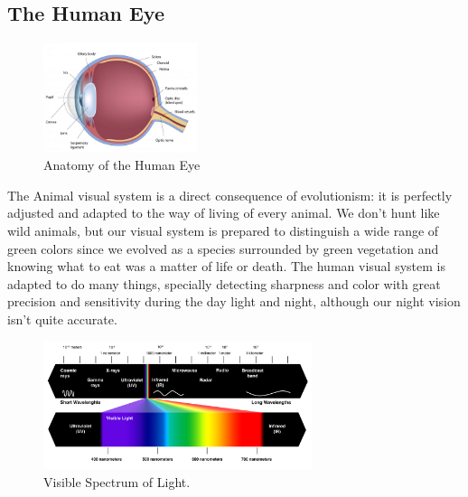 \documentclass{report}
\begin{document}
\subsection{The Human Eye}
\label{sec:humaneye}
%
\begin{figure}
	\begin{center}
    \vspace{-2\baselineskip}
	\includegraphics[width=0.4\textwidth]{Eye_Anatomy.jpg}
	\end{center}
    \caption[The Human Eye]{Anatomy of the Human Eye\protect\footnotemark{}}
    \label{fig:eye}
\end{figure}
%
The Animal visual system is a direct consequence of evolutionism: it is perfectly adjusted and adapted
to the way of living of every animal. We don’t hunt like wild animals, but our visual system is
prepared to distinguish a wide range of green colors since we evolved as a species surrounded by green
vegetation and knowing what to eat was a matter of life or death. The human visual system is adapted
to do many things, specially detecting sharpness and color with great precision and sensitivity during
the day light and night, although our night vision isn’t quite accurate. \par
%
\begin{figure}[H]
	\centering
    \vspace{-15pt}
	\includegraphics[width=0.7\textwidth]{Visible-spectrum.jpg}
    \caption[Visible Spectrum of Light]{Visible Spectrum of Light.\protect\footnotemark{}}
    \vspace{-15pt}
    \label{fig:lightspectrum}
\end{figure}
\end{document}
